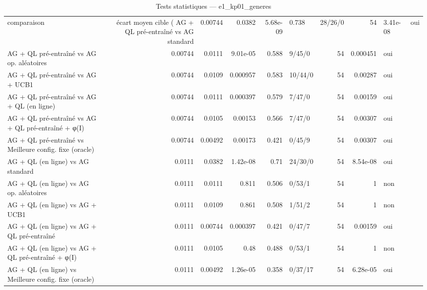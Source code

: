 \begin{table}
\caption{Tests statistiques — e1_kp01_generes}
\label{tab:tests-e1_kp01_generes}
\begin{tabular}{lrrrrlrrl}
\toprule
comparaison & écart moyen cible (%
\midrule
AG + QL pré-entraîné vs AG standard & 0.00744 & 0.0382 & 5.68e-09 & 0.738 & 28/26/0 & 54 & 3.41e-08 & oui \\
AG + QL pré-entraîné vs AG op. aléatoires & 0.00744 & 0.0111 & 9.01e-05 & 0.588 & 9/45/0 & 54 & 0.000451 & oui \\
AG + QL pré-entraîné vs AG + UCB1 & 0.00744 & 0.0109 & 0.000957 & 0.583 & 10/44/0 & 54 & 0.00287 & oui \\
AG + QL pré-entraîné vs AG + QL (en ligne) & 0.00744 & 0.0111 & 0.000397 & 0.579 & 7/47/0 & 54 & 0.00159 & oui \\
AG + QL pré-entraîné vs AG + QL pré-entraîné + φ(I) & 0.00744 & 0.0105 & 0.00153 & 0.566 & 7/47/0 & 54 & 0.00307 & oui \\
AG + QL pré-entraîné vs Meilleure config. fixe (oracle) & 0.00744 & 0.00492 & 0.00173 & 0.421 & 0/45/9 & 54 & 0.00307 & oui \\
AG + QL (en ligne) vs AG standard & 0.0111 & 0.0382 & 1.42e-08 & 0.71 & 24/30/0 & 54 & 8.54e-08 & oui \\
AG + QL (en ligne) vs AG op. aléatoires & 0.0111 & 0.0111 & 0.811 & 0.506 & 0/53/1 & 54 & 1 & non \\
AG + QL (en ligne) vs AG + UCB1 & 0.0111 & 0.0109 & 0.861 & 0.508 & 1/51/2 & 54 & 1 & non \\
AG + QL (en ligne) vs AG + QL pré-entraîné & 0.0111 & 0.00744 & 0.000397 & 0.421 & 0/47/7 & 54 & 0.00159 & oui \\
AG + QL (en ligne) vs AG + QL pré-entraîné + φ(I) & 0.0111 & 0.0105 & 0.48 & 0.488 & 0/53/1 & 54 & 1 & non \\
AG + QL (en ligne) vs Meilleure config. fixe (oracle) & 0.0111 & 0.00492 & 1.26e-05 & 0.358 & 0/37/17 & 54 & 6.28e-05 & oui \\
\bottomrule
\end{tabular}
\end{table}
